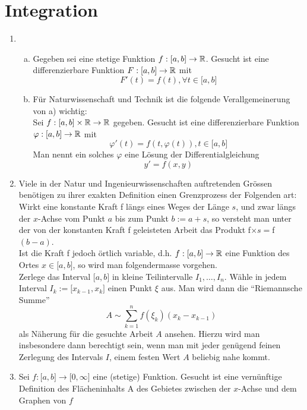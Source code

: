 \chapter{Integration}

\begin{enumerate}[\indent I)]
\item \begin{enumerate}[a)]
\item Gegeben sei eine stetige Funktion $f : \lbrack a,b\rbrack \to \R$. Gesucht ist eine differenzierbare Funktion $F: \lbrack a,b\rbrack \to \R$ mit \[F'(t)=f(t), \forall t \in \lbrack a,b \rbrack\]
\item Für Naturwissenschaft und Technik ist die folgende Verallgemeinerung von a) wichtig:\\
Sei $f:\lbrack a,b\rbrack \times \R \to \R$ gegeben. Gesucht ist eine differenzierbare Funktion $\varphi : \lbrack a,b\rbrack \to \R$ mit \[\varphi ' (t)=f(t,\varphi (t)), t\in \lbrack a,b \rbrack\] Man nennt ein solches $\varphi$ eine Lösung der Differentialgleichung \[y'=f(x,y)\]
\end{enumerate}
\item Viele in der Natur und Ingenieurwissenschaften auftretenden Grössen benötigen zu ihrer exakten Definition einen Grenzprozess der Folgenden art: \\
Wirkt eine konstante Kraft f längs eines Weges der Länge $s$, und zwar längs der $x$-Achse vom Punkt $a$ bis zum Punkt $b:=a+s$, so versteht man unter der von der konstanten Kraft f geleisteten Arbeit das Produkt f$\times s=$f$(b-a)$. \\
Ist die Kraft f jedoch örtlich variable, d.h. $f:\lbrack a,b\rbrack \to \R$ eine Funktion des Ortes $x \in \lbrack a,b\rbrack$, so wird man folgendermasse vorgehen.\\

Zerlege das Interval $\lbrack a,b\rbrack$ in kleine Teilintervalle $I_{1},\dots, I_{n}$. Wähle in jedem Interval $I_{k}:=\lbrack x_{k-1}, x_{k}\rbrack$ einen Punkt $\xi$ aus. Man wird dann die ``Riemannsche Summe'' \[A \sim  \sum\limits_{k = 1}^n {f({\xi_k})({x_k} - {x_{k - 1}})} \]  als Näherung für die gesuchte Arbeit $A$ ansehen. Hierzu wird man insbesondere dann berechtigt sein, wenn man mit jeder genügend feinen Zerlegung des Intervals $I$, einem festen Wert $A$ beliebig nahe kommt. 

\item Sei $f: \lbrack a,b\rbrack \to \lbrack 0,\infty\rbrack$ eine (stetige) Funktion. Gesucht ist eine vernünftige Definition des Flächeninhalts A des Gebietes zwischen der $x$-Achse und dem Graphen von $f$
\begin{center}
\begin{tikzpicture}



\end{tikzpicture}
\end{center}
\end{enumerate}
